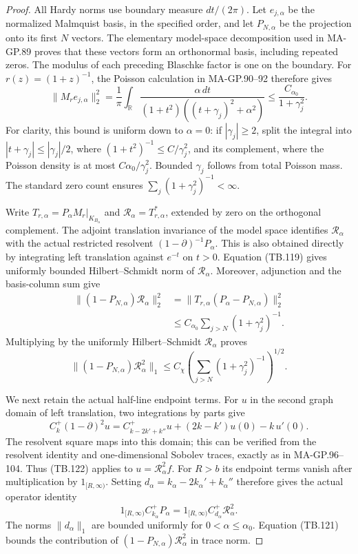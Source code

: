 \begin{proof}
All Hardy norms use boundary measure \(dt/(2\pi)\).
Let \(e_{j,\alpha}\) be the normalized Malmquist basis,
in the specified order, and let \(P_{N,\alpha}\) be
the projection onto its first \(N\) vectors.
The elementary model-space decomposition used in
MA-GP.89 proves that these vectors form an orthonormal
basis, including repeated zeros.
The modulus of each preceding Blaschke factor is one
on the boundary.  For
\(r(z)=(1+z)^{-1}\), the Poisson calculation in
MA-GP.90--92 therefore gives
\[
 \|M_r e_{j,\alpha}\|_2^2
  =\frac1\pi\int_{\mathbb R}
       \frac{\alpha\,dt}
            {(1+t^2)((t+\gamma_j)^2+\alpha^2)}
  \leq \frac{C_{\alpha_0}}{1+\gamma_j^2}.
 \tag{TB.119}
\]
For clarity, this bound is uniform down to \(\alpha=0\):
if \(|\gamma_j|\geq2\), split the integral into
\(|t+\gamma_j|\leq|\gamma_j|/2\), where
\((1+t^2)^{-1}\leq C/\gamma_j^2\), and its
complement, where the Poisson density is at most
\(C\alpha_0/\gamma_j^2\).
Bounded \(\gamma_j\) follows from total Poisson mass.
The standard zero count ensures
\(\sum_j(1+\gamma_j^2)^{-1}<\infty\).

Write \(T_{r,\alpha}=P_\alpha M_r|_{K_{B_\alpha}}\)
and \(\mathcal R_\alpha=T_{r,\alpha}^*\), extended
by zero on the orthogonal complement.
The adjoint translation invariance of the model space
identifies \(\mathcal R_\alpha\) with the actual
restricted resolvent \((1-\partial)^{-1}P_\alpha\).
This is also obtained directly by integrating left
translation against \(e^{-t}\) on \(t>0\).
Equation (TB.119) gives uniformly bounded
Hilbert--Schmidt norm of \(\mathcal R_\alpha\).
Moreover, adjunction and the basis-column sum give
\[
 \begin{split}
 \|(1-P_{N,\alpha})\mathcal R_\alpha\|_2^2
 &=\|T_{r,\alpha}(P_\alpha-P_{N,\alpha})\|_2^2\\
 &\leq C_{\alpha_0}
                 \sum_{j>N}(1+\gamma_j^2)^{-1}.
 \end{split}
 \tag{TB.120}
\]
Multiplying by the uniformly Hilbert--Schmidt
\(\mathcal R_\alpha\) proves
\[
 \|(1-P_{N,\alpha})\mathcal R_\alpha^2\|_1
       \leq C_\chi
             \left(\sum_{j>N}(1+\gamma_j^2)^{-1}\right)^{1/2}.
 \tag{TB.121}
\]

We next retain the actual half-line endpoint terms.
For \(u\) in the second graph domain of left
translation, two integrations by parts give
\[
 C_k^+(1-\partial)^2u
   =C_{k-2k'+k''}^+u+(2k-k')u(0)-k\,u'(0).
 \tag{TB.122}
\]
The resolvent square maps into this domain; this can
be verified from the resolvent identity and one-dimensional
Sobolev traces, exactly as in MA-GP.96--104.
Thus (TB.122) applies to \(u=\mathcal R_\alpha^2 f\).
For \(R>b\) its endpoint terms vanish after multiplication
by \(1_{[R,\infty)}\).
Setting \(d_\alpha=k_\alpha-2k_\alpha'+k_\alpha''\)
therefore gives the actual operator identity
\[
 1_{[R,\infty)}C_{k_\alpha}^+P_\alpha
      =1_{[R,\infty)}C_{d_\alpha}^+
                                     \mathcal R_\alpha^2.
 \tag{TB.123}
\]
The norms \(\|d_\alpha\|_1\) are bounded uniformly for
\(0<\alpha\leq\alpha_0\).
Equation (TB.121) bounds the contribution of
\((1-P_{N,\alpha})\mathcal R_\alpha^2\) in trace norm.


\end{proof}
